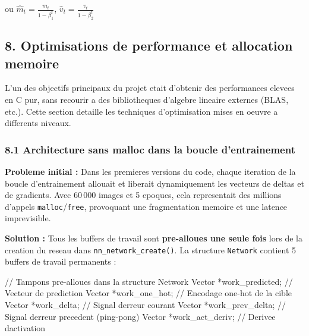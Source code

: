 \documentclass[
  letterpaper,
  DIV=11,
  numbers=noendperiod]{scrartcl}
\newenvironment{Shaded}{\begin{snugshade}}{\end{snugshade}}
\newcommand{\CommentTok}[1]{\textcolor[rgb]{0.37,0.37,0.37}{#1}}
\newcommand{\NormalTok}[1]{\textcolor[rgb]{0.00,0.23,0.31}{#1}}
\newcommand{\OperatorTok}[1]{\textcolor[rgb]{0.37,0.37,0.37}{#1}}
\begin{document}
ou \(\hat{m}_t = \frac{m_t}{1-\beta_1^t}\), \(\hat{v}_t = \frac{v_t}{1-\beta_2^t}\)

\subsection{8. Optimisations de performance et allocation memoire}\label{optimisations-performance}

L'un des objectifs principaux du projet etait d'obtenir des performances elevees en C pur, sans recourir a des bibliotheques d'algebre lineaire externes (BLAS, etc.). Cette section detaille les techniques d'optimisation mises en oeuvre a differents niveaux.

\subsubsection{8.1 Architecture sans malloc dans la boucle d'entrainement}\label{sans-malloc}

\textbf{Probleme initial :} Dans les premieres versions du code, chaque iteration de la boucle d'entrainement allouait et liberait dynamiquement les vecteurs de deltas et de gradients. Avec 60\,000 images et 5 epoques, cela representait des millions d'appels \texttt{malloc}/\texttt{free}, provoquant une fragmentation memoire et une latence imprevisible.

\textbf{Solution :} Tous les buffers de travail sont \textbf{pre-alloues une seule fois} lors de la creation du reseau dans \texttt{nn\_network\_create()}. La structure \texttt{Network} contient 5 buffers de travail permanents :

\begin{Shaded}
\begin{Highlighting}[]
\CommentTok{// Tampons pre-alloues dans la structure Network}
\NormalTok{Vector }\OperatorTok{*}\NormalTok{work\_predicted}\OperatorTok{;}   \CommentTok{// Vecteur de prediction}
\NormalTok{Vector }\OperatorTok{*}\NormalTok{work\_one\_hot}\OperatorTok{;}    \CommentTok{// Encodage one-hot de la cible}
\NormalTok{Vector }\OperatorTok{*}\NormalTok{work\_delta}\OperatorTok{;}      \CommentTok{// Signal d\textquotesingle{}erreur courant}
\NormalTok{Vector }\OperatorTok{*}\NormalTok{work\_prev\_delta}\OperatorTok{;} \CommentTok{// Signal d\textquotesingle{}erreur precedent (ping-pong)}
\NormalTok{Vector }\OperatorTok{*}\NormalTok{work\_act\_deriv}\OperatorTok{;}  \CommentTok{// Derivee d\textquotesingle{}activation}
\end{Highlighting}
\end{Shaded}
\end{document}
